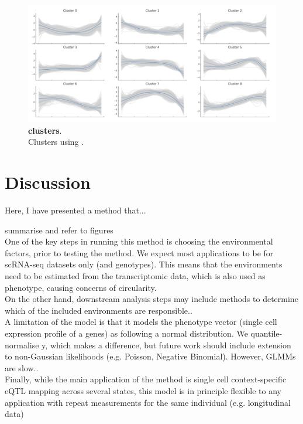 \begin{figure}[h]
\centering
\includegraphics[width=15.5cm]{Chapter6/Fig/sc_structlmm_clusters.png}
\caption[clusters]{\textbf{clusters}.\\
Clusters using .}
\label{fig:sc_structlmm_clusters}
\end{figure}

\clearpage

\section{Discussion}

Here, I have presented a method that...

summarise and refer to figures\\

One of the key steps in running this method is choosing the environmental factors, prior to testing the method.
We expect most applications to be for scRNA-seq datasets only (and genotypes).
This means that the environments need to be estimated from the transcriptomic data, which is also used as phenotype, causing concerns of circularity.\\

On the other hand, downstream analysis steps may include methods to determine which of the included environments are responsible..\\

A limitation of the model is that it models the phenotype vector (single cell expression profile of a genes) as following a normal distribution.
We quantile-normalise y, which makes a difference, but future work should include extension to non-Gaussian likelihoods (e.g. Poisson, Negative Binomial).
However, GLMMs are slow..\\

Finally, while the main application of the method is single cell context-specific eQTL mapping across several states, this model is in principle flexible to any application with repeat measurements for the same individual (e.g. longitudinal data)
